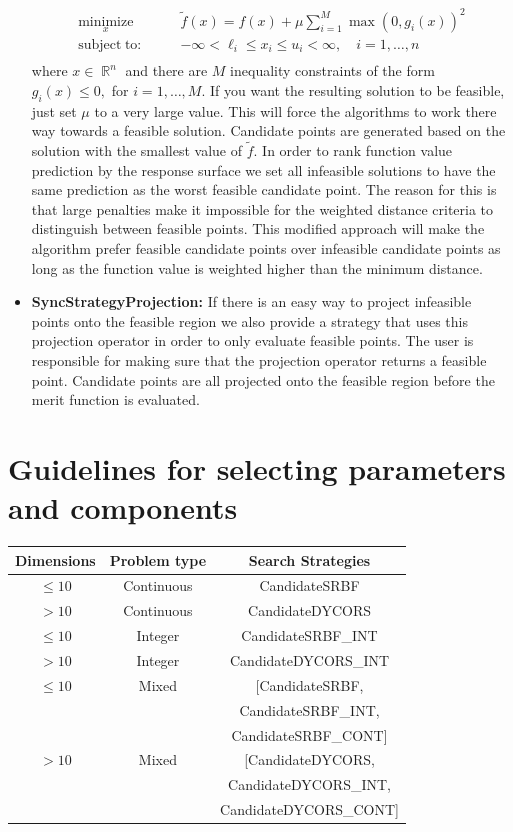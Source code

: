 \documentclass[]{article}
\DeclareMathOperator{\Rb}{\mathbb{R}}
\begin{document}
\begin{itemize}
\begin{align*}
\underset{x}{\operatorname{minimize}} \qquad &\widetilde{f}(x)=f(x)+\mu \sum_{i=1}^M \max(0,g_i(x))^2 \\
\operatorname{subject\;to:} \qquad &-\infty<\ell_i \leq x_i \leq u_i<\infty, \quad i = 1,\ldots,n \\
\end{align*}
where $x \in \Rb^n$ and there are $M$ inequality constraints of the form $g_i(x) \leq 0,$ for $i=1,\ldots,M$. If you want the resulting solution to be feasible, just set $\mu$ to a very large value. This will force the algorithms to work there way towards a feasible solution. Candidate points are generated based on the solution with the smallest value of $\widetilde{f}$. In order to rank function value prediction by the response surface we set all infeasible solutions to have the same prediction as the worst feasible candidate point. The reason for this is that large penalties make it impossible for the weighted distance criteria to distinguish between feasible points. This modified approach will make the algorithm prefer feasible candidate points over infeasible candidate points as long as the function value is weighted higher than the minimum distance.
\item \textbf{SyncStrategyProjection:} If there is an easy way to project infeasible points onto the feasible region we also provide a strategy that uses this projection operator in order to only evaluate feasible points. The user is responsible for making sure that the projection operator returns a feasible point. Candidate points are all projected onto the feasible region before the merit function is evaluated.
\end{itemize}

\section{Guidelines for selecting parameters and components}
\begin{center}
\begin{tabular}{ c c | c }
  \hline			
Dimensions & Problem type & Search Strategies \\
  \hline  
  $\leq 10$ & Continuous & CandidateSRBF \\
   $> 10$ & Continuous & CandidateDYCORS\\
   \hline
     $\leq 10$ & Integer & CandidateSRBF\_INT \\
   $> 10$ & Integer & CandidateDYCORS\_INT \\
   \hline
   $\leq 10$ & Mixed &  \multirow{1}{*}{[CandidateSRBF,} \\ & & CandidateSRBF\_INT,  \\ & & CandidateSRBF\_CONT] \\
      $> 10$ & Mixed &  \multirow{1}{*}{[CandidateDYCORS,} \\ & & CandidateDYCORS\_INT, \\ & & CandidateDYCORS\_CONT] \\
      \hline
\end{tabular}
\end{center}
\end{document}

